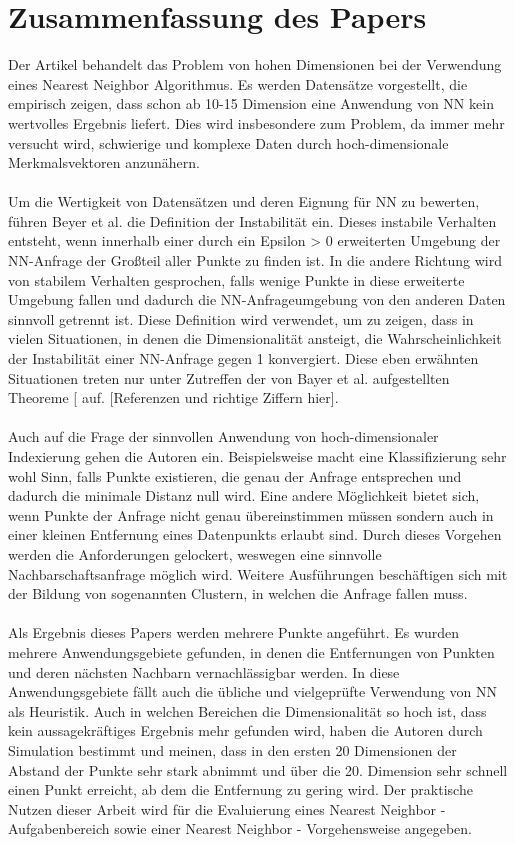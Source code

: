 \documentclass{article}
\begin{document}
\section{Zusammenfassung des Papers}
Der Artikel behandelt das Problem von hohen Dimensionen bei der Verwendung eines Nearest Neighbor Algorithmus. Es werden Datensätze vorgestellt, die empirisch zeigen, dass schon ab 10-15 Dimension eine Anwendung von NN kein wertvolles Ergebnis liefert. Dies wird insbesondere zum Problem, da immer mehr versucht wird, schwierige und komplexe Daten durch hoch-dimensionale Merkmalsvektoren anzunähern.  
\\
\\
Um die Wertigkeit von Datensätzen und deren Eignung für NN zu bewerten, führen Beyer et al. die Definition der Instabilität ein. Dieses instabile Verhalten entsteht, wenn innerhalb einer durch ein Epsilon > 0 erweiterten Umgebung der NN-Anfrage der Großteil aller Punkte zu finden ist. In die andere Richtung wird von stabilem Verhalten gesprochen, falls wenige Punkte in diese erweiterte Umgebung fallen und dadurch die NN-Anfrageumgebung von den anderen Daten sinnvoll getrennt ist. 
Diese Definition wird verwendet, um zu zeigen, dass in vielen Situationen, in denen die Dimensionalität ansteigt, die Wahrscheinlichkeit der Instabilität einer NN-Anfrage gegen 1 konvergiert. Diese eben erwähnten Situationen treten nur unter Zutreffen der von Bayer et al. aufgestellten Theoreme [ auf. [Referenzen und richtige Ziffern hier].
\\
\\
Auch auf die Frage der sinnvollen Anwendung von hoch-dimensionaler Indexierung gehen die Autoren ein. Beispielsweise macht eine Klassifizierung sehr wohl Sinn, falls Punkte existieren, die genau der Anfrage entsprechen und dadurch die minimale Distanz null wird. Eine andere Möglichkeit bietet sich, wenn Punkte der Anfrage nicht genau übereinstimmen müssen sondern auch in einer kleinen Entfernung eines Datenpunkts erlaubt sind. Durch dieses Vorgehen werden die Anforderungen gelockert, weswegen eine sinnvolle Nachbarschaftsanfrage möglich wird. Weitere Ausführungen beschäftigen sich mit der Bildung von sogenannten Clustern, in welchen die Anfrage fallen muss.
\\
\\
Als Ergebnis dieses Papers werden mehrere Punkte angeführt. Es wurden mehrere Anwendungsgebiete gefunden, in denen die Entfernungen von Punkten und deren nächsten Nachbarn vernachlässigbar werden. In diese Anwendungsgebiete fällt auch die übliche und vielgeprüfte Verwendung von NN als Heuristik. 
Auch in welchen Bereichen die Dimensionalität so hoch ist, dass kein aussagekräftiges Ergebnis mehr gefunden wird, haben die Autoren durch Simulation bestimmt und meinen, dass in den ersten 20 Dimensionen der Abstand der Punkte sehr stark abnimmt und über die 20. Dimension sehr schnell einen Punkt erreicht, ab dem die Entfernung zu gering wird. 
Der praktische Nutzen dieser Arbeit wird für die Evaluierung eines Nearest Neighbor - Aufgabenbereich sowie einer Nearest Neighbor - Vorgehensweise angegeben. 
\end{document}
